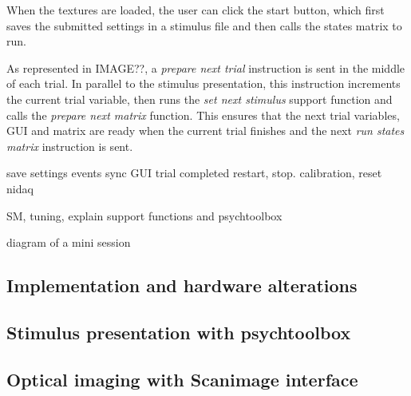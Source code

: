 When the textures are loaded, the user can click the start button, which first saves the submitted settings in a stimulus file and then calls the states matrix to run.

As represented in IMAGE??, a \textit{prepare next trial} instruction is sent in the middle of each trial. In parallel to the stimulus presentation, this instruction increments the current trial variable, then runs the \textit{set next stimulus} support function and calls the \textit{prepare next matrix} function. This ensures that the next trial variables, GUI and matrix are ready when the current trial finishes and the next \textit{run states matrix} instruction is sent.

save settings events
sync GUI
trial completed
restart, stop. calibration, reset nidaq

SM, tuning, explain support functions and psychtoolbox

diagram of a mini session

\subsection{Implementation and hardware alterations}
\label{subsec:subbsectionC}

\subsection{Stimulus presentation with psychtoolbox}
\label{subsec:subdsectionC}

\subsection{Optical imaging with Scanimage interface}
\label{subsec:subesectionC}